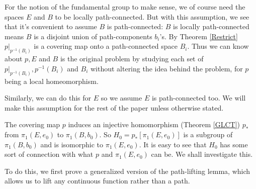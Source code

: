 \documentclass{amsart}
\theoremstyle{definition}
\theoremstyle{remark}
\numberwithin{equation}{section}
\begin{document}
\noindent For the notion of the fundamental group to make sense, we of course need the spaces $E$ and $B$ to be locally path-connected. But with this assumption, we see that it's convenient to assume $B$ is path-connected: $B$ is locally path-connected means $B$ is a disjoint union of path-components $b_i$'s. By Theorem \ref{Restrict} $p |_{p^{-1}(B_i)}$ is a covering map onto a path-connected space $B_i$. Thus we can know about $p, E$ and $B$ is the original problem by studying each set of $p |_{p^{-1}(B_i)}, p^{-1}(B_i)$ and $B_i$ without altering the idea behind the problem, for $p$ being a local homeomorphism.

Similarly, we can do this for $E$ so we assume $E$ is path-connected too. We will make this assumption for the rest of the paper unless otherwise stated.

The covering map $p$ induces an injective homomorphism (Theorem \ref{GLCT}) $p_*$ from $\pi_1(E, e_0)$ to $\pi_1(B, b_0)$. So $H_0 = p_*[\pi_1(E, e_0)]$ is a subgroup of  $\pi_1(B, b_0)$ and is isomorphic to $\pi_1(E, e_0)$. It is easy to see that $H_0$ has some sort of connection with what $p$ and $\pi_1(E, e_0)$ can be. We shall investigate this.

To do this, we first prove a generalized version of the path-lifting lemma, which allows us to lift any continuous function rather than a path.
\end{document}
